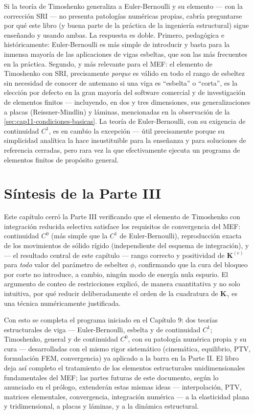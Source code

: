 \begin{observacion}
Si la teoría de Timoshenko generaliza a Euler-Bernoulli y su elemento --- con la corrección SRI --- no presenta patologías numéricas propias, cabría preguntarse por qué este libro (y buena parte de la práctica de la ingeniería estructural) sigue enseñando y usando ambas. La respuesta es doble. Primero, pedagógica e históricamente: Euler-Bernoulli es más simple de introducir y basta para la inmensa mayoría de las aplicaciones de vigas esbeltas, que son las más frecuentes en la práctica. Segundo, y más relevante para el MEF: el elemento de Timoshenko con SRI, precisamente \emph{porque} es válido en todo el rango de esbeltez sin necesidad de conocer de antemano si una viga es ``esbelta'' o ``corta'', es la elección por defecto en la gran mayoría del software comercial y de investigación de elementos finitos --- incluyendo, en dos y tres dimensiones, sus generalizaciones a placas (Reissner-Mindlin) y láminas, mencionadas en la observación de la \cref{sec:cap11-condiciones-basicas}. La teoría de Euler-Bernoulli, con su exigencia de continuidad $C^1$, es en cambio la excepción --- útil precisamente porque su simplicidad analítica la hace insustituible para la enseñanza y para soluciones de referencia cerradas, pero rara vez la que efectivamente ejecuta un programa de elementos finitos de propósito general.
\end{observacion}

\section{Síntesis de la Parte III}

Este capítulo cerró la Parte III verificando que el elemento de Timoshenko con integración reducida selectiva satisface los requisitos de convergencia del MEF: continuidad $C^0$ (más simple que la $C^1$ de Euler-Bernoulli), reproducción exacta de los movimientos de sólido rígido (independiente del esquema de integración), y --- el resultado central de este capítulo --- rango correcto y positividad de $\bm K^{(e)}$ para \emph{todo} valor del parámetro de esbeltez $\phi$, confirmando que la cura del bloqueo por corte no introduce, a cambio, ningún modo de energía nula espurio. El argumento de conteo de restricciones explicó, de manera cuantitativa y no solo intuitiva, por qué reducir deliberadamente el orden de la cuadratura de $\bm K_\gamma$ es una técnica numéricamente justificada.

Con esto se completa el programa iniciado en el Capítulo 9: dos teorías estructurales de viga --- Euler-Bernoulli, esbelta y de continuidad $C^1$; Timoshenko, general y de continuidad $C^0$, con su patología numérica propia y su cura --- desarrolladas con el mismo rigor sistemático (cinemática, equilibrio, PTV, formulación FEM, convergencia) ya aplicado a la barra en la Parte II. El libro deja así completo el tratamiento de los elementos estructurales unidimensionales fundamentales del MEF; las partes futuras de este documento, según lo anunciado en el prólogo, extenderán estas mismas ideas --- interpolación, PTV, matrices elementales, convergencia, integración numérica --- a la elasticidad plana y tridimensional, a placas y láminas, y a la dinámica estructural.
